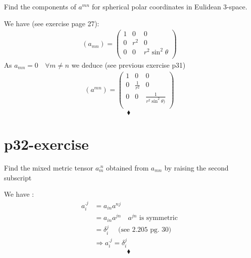\begin{tcolorbox}
Find the components of $a^{mn}$ for spherical polar coordinates in Eulidean 3-space.
\end{tcolorbox}
We have (see exercise page 27):
\begin{align}
\ (a_{mn}) = \begin{pmatrix}
 1& 0 & 0\\
0 & r^2 & 0 \\
0 & 0 & r^2\sin^2\theta \\
\end{pmatrix}
\end{align}
As $a_{mn} = 0 \quad \forall m \neq n$ we deduce (see previous exercise p31)
\begin{align}
\ (a^{mn}) = \begin{pmatrix}
 1& 0 & 0\\
0 & \frac{1}{r^2} & 0 \\
0 & 0 & \frac{1}{r^2\sin^2\theta)}\\
\end{pmatrix}
\end{align}
$$\blacklozenge$$
\newpage

\section{p32-exercise}

\begin{tcolorbox}
Find the mixed metric tensor  $a^{.n}_m$ obtained from $a_{mn}$ by raising the second subscript
\end{tcolorbox}
We have :
\begin{align}
\ a_{i}^{.j} &=  a_{in}a^{nj}\\
\ &=  a_{in}a^{jn}\quad a^{jn} \text{  is symmetric}\\
\ &= \delta^j_i \quad \text{ (see 2.205 pg. 30)}\\
\ &\Rightarrow a_{i}^{.j} = \delta^j_i 
\end{align}
$$\blacklozenge$$
\newpage

